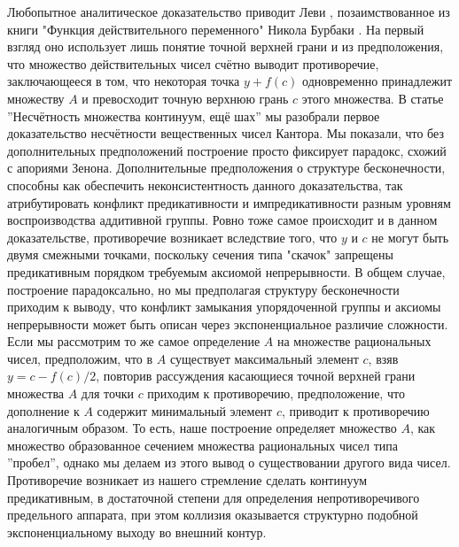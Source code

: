 \documentclass[12pt]{article}
\begin{document}
Любопытное аналитическое доказательство приводит Леви \cite{supremum}, позаимствованное из книги "Функция действительного переменного" Никола Бурбаки \cite{fonctions}. На первый взгляд оно использует лишь понятие точной верхней грани и из предположения, что множество действительных чисел счётно выводит противоречие, заключающееся в том, что некоторая точка $y + f(c)$ одновременно принадлежит множеству $A$ и превосходит точную верхнюю грань $c$ этого множества. В статье ''Несчётность множества континуум, ещё шах'' мы разобрали первое доказательство несчётности вещественных чисел Кантора. Мы показали, что без дополнительных предположений построение просто фиксирует парадокс, схожий с апориями Зенона. Дополнительные предположения о структуре бесконечности, способны как обеспечить неконсистентность данного доказательства, так атрибутировать конфликт предикативности и импредикативности разным уровням воспроизводства аддитивной группы. Ровно тоже самое происходит и в данном доказательстве, противоречие возникает вследствие того, что $y$ и $c$ не могут быть двумя смежными точками, поскольку сечения типа "скачок" запрещены предикативным порядком требуемым аксиомой непрерывности. В общем случае, построение парадоксально, но мы предполагая структуру бесконечности приходим к выводу, что конфликт замыкания упорядоченной группы и аксиомы непрерывности может быть описан через экспоненциальное различие сложности. Если мы рассмотрим то же самое определение $A$ на множестве рациональных чисел, предположим, что в $A$ существует максимальный элемент $c$, взяв $y = c - f(c)/2$, повторив рассуждения касающиеся точной верхней грани множества $A$ для точки $c$ приходим к противоречию, предположение, что дополнение к $A$ содержит минимальный элемент $c$, приводит к противоречию аналогичным образом. То есть, наше построение определяет множество $A$, как множество образованное сечением множества рациональных чисел типа ''пробел'', однако мы делаем из этого вывод о существовании другого вида чисел. Противоречие возникает из нашего стремление сделать континуум предикативным, в достаточной степени для определения непротиворечивого предельного аппарата, при этом коллизия оказывается структурно подобной экспоненциальному выходу во внешний контур. 
\end{document}
